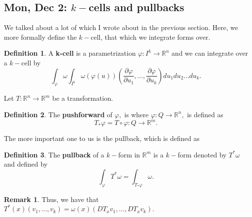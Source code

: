 \documentclass[10pt, oneside]{article}
\newcommand{\bbR}{\mathbb{R}}
\theoremstyle{definition}
\newtheorem{defn}{Definition}
\newtheorem{rem}{Remark}
\begin{document}
\newpage
\subsection*{Mon, Dec 2: $k-$cells and pullbacks}
We talked about a lot of which I wrote about in the previous section. Here, we more formally define the $k-$cell, that which we integrate forms over. 
\begin{defn}
    A \textbf{k-cell} is a parametrization $\varphi: I^k \to \bbR^n$ and we can integrate over a $k-$cell by 
    \[\int_\varphi \omega \int_{I^k}\omega(\varphi(u))(\frac{\partial \varphi}{\partial u_1}, \dots, \frac{\partial \varphi}{\partial u_k}) du_1du_2\dots du_k.\]
\end{defn}
Let $T: \bbR^n \to \bbR^m$ be a transformation.
\begin{defn}
    The \textbf{ pushforward} of $\varphi,$ is where $\varphi: Q \to \bbR^n,$ is defined as 
    \[T_{\ast} \varphi = T \circ \varphi : Q \to \bbR^m.\]
\end{defn}
The more important one to us is the pullback, which is defined as 
\begin{defn}
    The \textbf{pullback} of a $k-$form in $\bbR^m$ is a $k-$form denoted by $T^\ast \omega$ and defined by 
    \[\int_\varphi T^\ast \omega = \int_{T_\ast \varphi} \omega.\]
\end{defn}
\begin{rem}
    Thus, we have that $T^\ast(x)(v_1, \dots, v_k) = \omega(x)(DT_xv_1, \dots, DT_x v_k).$
\end{rem}
\newpage
\end{document}
